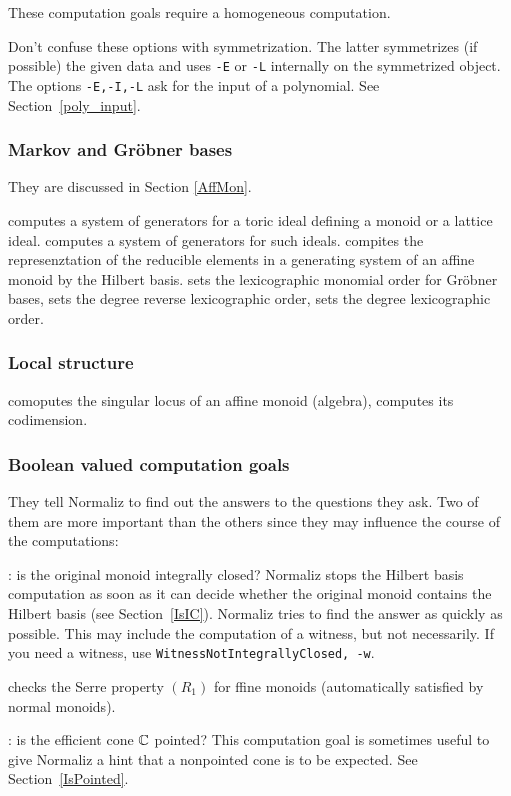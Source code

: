 These computation goals require a homogeneous computation.

Don't confuse these options with symmetrization. The latter symmetrizes (if possible) the given data and uses \verb|-E| or \verb|-L| internally on the symmetrized object. The options \verb|-E,-I,-L| ask for the input of a polynomial. See Section~\ref{poly_input}.

\subsubsection{Markov and Gröbner bases}

They are discussed in Section \ref{AffMon}.
\begin{itemize}
	\itemtt[MarkovBasis] computes a system of generators for a toric ideal defining a monoid or a lattice ideal. 
	\itemtt[GroebnerBasis] computes a system of generators for such ideals.
	\itemtt[Representations] compites the represenztation of the reducible elements in a generating system of an affine monoid by the Hilbert basis.
	\itemtt[Lex] sets the lexicographic monomial order for Gröbner bases,
	\itemtt[RevLex] sets the degree reverse lexicographic order,
	\itemtt[DegLex] sets the degree lexicographic order.
\end{itemize}

\subsubsection{Local structure}

\begin{itemize}
	\itemtt[SingularLocus] comoputes the singular locus of an affine monoid (algebra),
	\itemtt[CodimSingularLocus] computes its codimension. 
\end{itemize}

\subsubsection{Boolean valued computation goals}\label{bool}

They tell Normaliz to find out the answers to the questions they ask. Two of them are more important than the others since they may influence the course of the computations:

\begin{itemize}
	\itemtt[IsIntegrallyClosed]: is the original monoid integrally closed? Normaliz stops the Hilbert basis computation as soon as it can decide whether the original monoid contains the Hilbert basis (see Section~\ref{IsIC}). Normaliz tries to find the answer as quickly as possible. This may include the computation of a witness, but not necessarily. If you need a witness, use \verb|WitnessNotIntegrallyClosed, -w|.
	
	\itemtt[IdsSerreR1] checks the Serre property $(R_1)$ for ffine monoids (automatically satisfied by normal monoids).
	
	\itemtt[IsPointed]: is the efficient cone ${\mathbb C}$ pointed? This computation goal is sometimes useful to give Normaliz a hint that a nonpointed cone is to be expected. See Section~\ref{IsPointed}.
\end{itemize}

